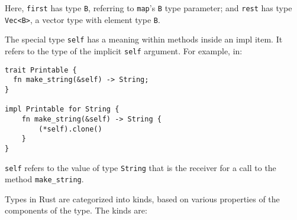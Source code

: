 \documentclass[]{article}
\begin{document}
Here, \texttt{first} has type \texttt{B}, referring to \texttt{map}'s
\texttt{B} type parameter; and \texttt{rest} has type
\texttt{Vec\textless{}B\textgreater{}}, a vector type with element type
\texttt{B}.


The special type \texttt{self} has a meaning within methods inside an
impl item. It refers to the type of the implicit \texttt{self} argument.
For example, in:

\begin{verbatim}
trait Printable {
  fn make_string(&self) -> String;
}

impl Printable for String {
    fn make_string(&self) -> String {
        (*self).clone()
    }
}
\end{verbatim}

\texttt{self} refers to the value of type \texttt{String} that is the
receiver for a call to the method \texttt{make\_string}.


Types in Rust are categorized into kinds, based on various properties of
the components of the type. The kinds are:
\end{document}
